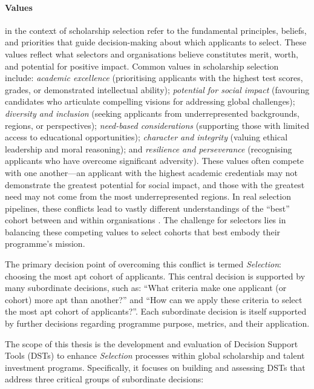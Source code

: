 \paragraph{Values} in the context of scholarship selection refer to the fundamental principles, beliefs, and priorities that guide decision-making about which applicants to select. These values reflect what selectors and organisations believe constitutes merit, worth, and potential for positive impact. Common values in scholarship selection include: \emph{academic excellence} (prioritising applicants with the highest test scores, grades, or demonstrated intellectual ability); \emph{potential for social impact} (favouring candidates who articulate compelling visions for addressing global challenges); \emph{diversity and inclusion} (seeking applicants from underrepresented backgrounds, regions, or perspectives); \emph{need-based considerations} (supporting those with limited access to educational opportunities); \emph{character and integrity} (valuing ethical leadership and moral reasoning); and \emph{resilience and perseverance} (recognising applicants who have overcome significant adversity). These values often compete with one another—an applicant with the highest academic credentials may not demonstrate the greatest potential for social impact, and those with the greatest need may not come from the most underrepresented regions. In real selection pipelines, these conflicts lead to vastly different understandings of the ``best'' cohort between and within organisations \cite{zimmerman_research_2014}. The challenge for selectors lies in balancing these competing values to select cohorts that best embody their programme's mission.

The primary decision point of overcoming this conflict is termed \emph{Selection}: choosing the most apt cohort of applicants. This central decision is supported by many subordinate decisions, such as: ``What criteria make one applicant (or cohort) more apt than another?'' and ``How can we apply these criteria to select the most apt cohort of applicants?''. Each subordinate decision is itself supported by further decisions regarding programme purpose, metrics, and their application.

The scope of this thesis is the development and evaluation of Decision Support Tools (DSTs) to enhance \emph{Selection} processes within global scholarship and talent investment programs. Specifically, it focuses on building and assessing DSTs that address three critical groups of subordinate decisions:


